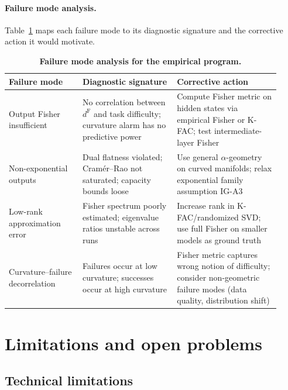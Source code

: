 \documentclass[11pt]{article}
\theoremstyle{remark}
\begin{document}
\paragraph{Failure mode analysis.}
Table~\ref{tab:failure-modes} maps each failure mode to its diagnostic
signature and the corrective action it would motivate.

\begin{table}[htbp]
\centering
\caption{\textbf{Failure mode analysis for the empirical program.}}
\label{tab:failure-modes}
\begin{tabularx}{\linewidth}{@{}p{0.25\linewidth}p{0.32\linewidth}p{0.35\linewidth}@{}}
\toprule
\textbf{Failure mode} & \textbf{Diagnostic signature} & \textbf{Corrective action} \\
\midrule
Output Fisher insufficient &
No correlation between $d^{\mathrm{F}}$ and task difficulty; curvature alarm
has no predictive power &
Compute Fisher metric on hidden states via empirical Fisher or K-FAC; test
intermediate-layer Fisher \\
\addlinespace[2pt]
Non-exponential outputs &
Dual flatness violated; Cram\'er--Rao not saturated; capacity bounds loose &
Use general $\alpha$-geometry on curved manifolds; relax exponential family
assumption IG-A3 \\
\addlinespace[2pt]
Low-rank approximation error &
Fisher spectrum poorly estimated; eigenvalue ratios unstable across runs &
Increase rank in K-FAC/randomized SVD; use full Fisher on smaller models
as ground truth \\
\addlinespace[2pt]
Curvature--failure decorrelation &
Failures occur at low curvature; successes occur at high curvature &
Fisher metric captures wrong notion of difficulty; consider non-geometric
failure modes (data quality, distribution shift) \\
\bottomrule
\end{tabularx}
\end{table}

\section{Limitations and open problems}
\label{sec:limitations}

\subsection{Technical limitations}
\end{document}
